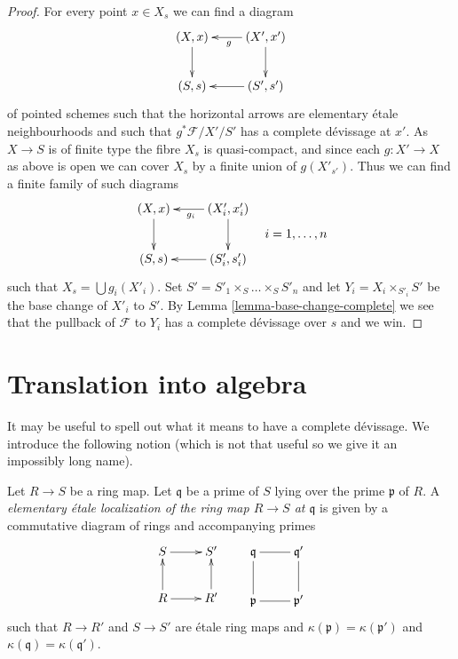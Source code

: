 \begin{proof}
For every point $x \in X_s$ we can find a diagram
$$
\xymatrix{
(X, x) \ar[d] & (X', x') \ar[l]^g \ar[d] \\
(S, s) & (S', s') \ar[l]
}
$$
of pointed schemes such that the horizontal arrows are elementary
\'etale neighbourhoods and such that $g^*\mathcal{F}/X'/S'$ has a
complete d\'evissage at $x'$. As $X \to S$ is of finite type the
fibre $X_s$ is quasi-compact, and since each $g : X' \to X$ as above
is open we can cover $X_s$ by a finite union of $g(X'_{s'})$.
Thus we can find a finite family of such diagrams
$$
\vcenter{
\xymatrix{
(X, x) \ar[d] & (X'_i, x'_i) \ar[l]^{g_i} \ar[d] \\
(S, s) & (S'_i, s'_i) \ar[l]
}
}
\quad i = 1, \ldots, n
$$
such that $X_s = \bigcup g_i(X'_i)$. Set
$S' = S'_1 \times_S \ldots \times_S S'_n$
and let $Y_i = X_i \times_{S'_i} S'$ be the base change of $X'_i$ to $S'$. By
Lemma \ref{lemma-base-change-complete}
we see that the pullback of $\mathcal{F}$ to $Y_i$ has a complete d\'evissage
over $s$ and we win.
\end{proof}



\section{Translation into algebra}
\label{section-translation}

\noindent
It may be useful to spell out what it means to have a complete d\'evissage.
We introduce the following notion (which is not that useful so we give it
an impossibly long name).

\begin{definition}
\label{definition-elementary-etale-neighbourhood}
Let $R \to S$ be a ring map. Let $\mathfrak q$ be a prime of $S$ lying over
the prime $\mathfrak p$ of $R$. A {\it elementary \'etale localization of
the ring map $R \to S$ at $\mathfrak q$} is given by a commutative diagram
of rings and accompanying primes
$$
\xymatrix{
S \ar[r] & S' \\
R \ar[u] \ar[r] & R' \ar[u]
}
\quad\quad
\xymatrix{
\mathfrak q \ar@{-}[r] & \mathfrak q' \\
\mathfrak p \ar@{-}[u] \ar@{-}[r] & \mathfrak p' \ar@{-}[u]
}
$$
such that $R \to R'$ and $S \to S'$ are \'etale ring maps and
$\kappa(\mathfrak p) = \kappa(\mathfrak p')$ and
$\kappa(\mathfrak q) = \kappa(\mathfrak q')$.
\end{definition}

